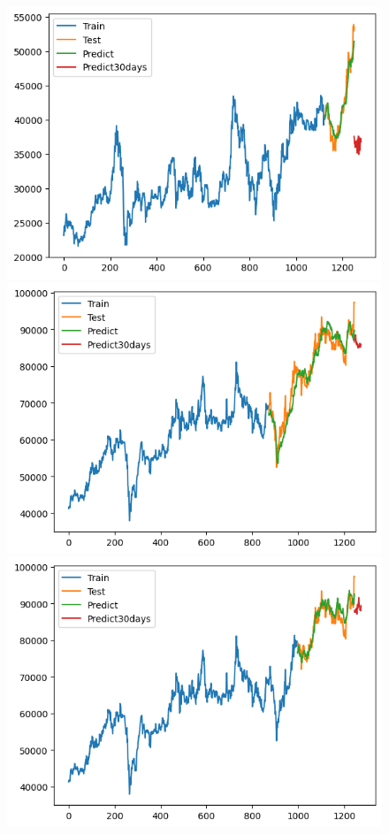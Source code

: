 \begin{figure}[H]
\begin{minipage}{0.15\textwidth}
    \centering
    \includegraphics[width=1\textwidth]{resources/chapter-5/result/BIDV_NBeats_9-1.png}
    \end{minipage}
    \hfill
    \begin{minipage}{0.15\textwidth}
    \centering
    \includegraphics[width=1\textwidth]{resources/chapter-5/result/VCB_NBeats_7-3.png}
    \end{minipage}
    \hfill
    \begin{minipage}{0.15\textwidth}
    \centering
    \includegraphics[width=1\textwidth]{resources/chapter-5/result/VCB_NBeats_8-2.png}

\end{minipage}
\end{figure}
